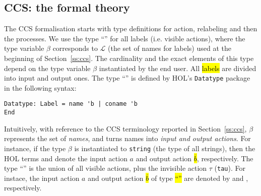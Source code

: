 
\subsection{CCS: the formal theory}
\label{ss:formalCCS}

The CCS formalisation starts with type definitions for action,
relabeling and then the  processes. We use the type ``''
for all labels (i.e. visible actions), where the type variable $\beta$ corresponds
to $\mathscr{L}$ (the set of names for labels) used at the beginning
of Section~\ref{ss:ccs}. The
cardinality and the exact elements of this type depend on the type variable $\beta$
instantiated by the end user.
All \hl{labels} are divided into input and output ones.
The type ``'' is defined by HOL's \texttt{Datatype} package in the
following syntax:
\begin{lstlisting}
Datatype: Label = name 'b | coname 'b
End
\end{lstlisting}
Intuitively, with reference to the CCS terminology reported in
Section~\ref{ss:ccs}, $\beta$ represents the set of \emph{names}, and
 turns names into
\emph{input
and output actions}. 
For instance, if the type $\beta$ is instantiated to \texttt{string}
(the type of all strings), then the HOL terms  and
 denote the input action $a$ and output
action \hl{$\overline{b}$}, respectively.
The type ``'' is the
union of all visible actions, plus the invisible action $\tau$
(\texttt{tau}). For instace, the input action $a$ and output
action \hl{$\overline{b}$} of type \hl{\mbox{``''}}
are denoted by  and , respectively.

